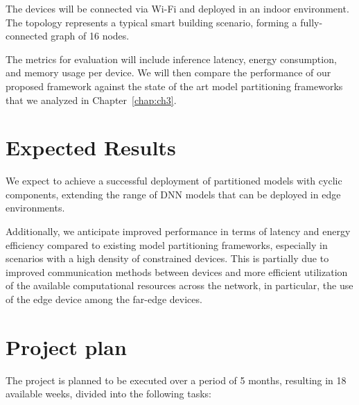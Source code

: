 The devices will be connected via Wi-Fi and deployed in an 
indoor environment. The topology represents a typical smart building 
scenario, forming a fully-connected graph of 16 nodes.

The metrics for evaluation will include inference latency, energy consumption, and
memory usage per device. We will then compare the performance of our proposed
framework against the state of the art model partitioning frameworks that we
analyzed in Chapter~\ref{chap:ch3}.

\section{Expected Results} \label{sec:se43}

We expect to achieve a successful deployment of partitioned models with cyclic 
components, extending the range of \ac{DNN} models that can be deployed in edge
environments. 

Additionally, we anticipate improved performance in terms of
latency and energy efficiency compared to existing model partitioning frameworks,
especially in scenarios with a high density of constrained devices. This is
partially due to improved communication methods between devices and more efficient
utilization of the available computational resources across the network, in
particular, the use of the edge device among the far-edge devices.

\section{Project plan} \label{sec:se44}

The project is planned to be executed over a period of 5 months, resulting in 
18 available weeks, divided into the following tasks:

